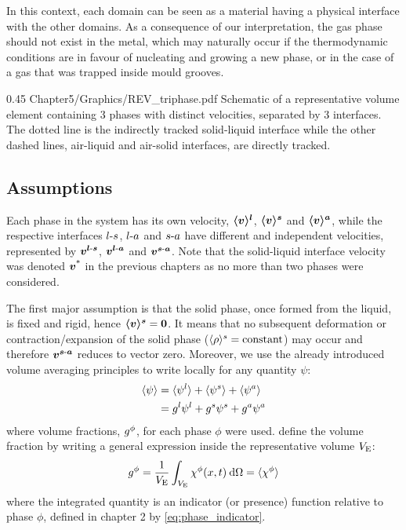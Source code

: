 In this context, each domain can be seen as a material having a physical
interface with the other domains. As a consequence of our interpretation, 
the gas phase should not exist in the metal, which may naturally
occur if the thermodynamic conditions are in favour of nucleating and growing 
a new phase, or in the case of a gas that was trapped inside mould grooves.
\begin{figureth}
{0.45}
{Chapter5/Graphics/REV_triphase.pdf}
{Schematic of a representative volume element containing 3 phases with distinct velocities, separated by 3 interfaces.
The dotted line is the indirectly tracked solid-liquid interface while the other dashed lines, air-liquid and air-solid
interfaces, are directly tracked.}
\label{fig:rev_triphase}
\end{figureth}

\subsection{Assumptions}
Each phase in the system has its own velocity, $\boldsymbol{\langle v \rangle^l}$, $\boldsymbol{\langle v \rangle^s}$ and $\boldsymbol{\langle v \rangle^a}$, while the respective
interfaces $l\text{-}s$, $l\text{-}a$ and $s\text{-}a$ have different and independent velocities, 
represented by $\boldsymbol{v^{l\text{-}s}}$, $\boldsymbol{v^{l\text{-}a}}$ and $\boldsymbol{v^{s\text{-}a}}$. Note that the solid-liquid interface
velocity was denoted $\boldsymbol{v^\text{*}}$ in the previous chapters as no more than two phases were considered.

The first major assumption is that the solid phase, once formed from the liquid, is fixed and rigid, hence $\boldsymbol{\langle v \rangle^s}=\boldsymbol{0}$.
It means that no subsequent deformation or contraction/expansion of the solid phase ($\langle \rho \rangle^s=\text{constant}$) may occur and therefore $\boldsymbol{v^{s\text{-}a}}$ reduces to vector zero.
Moreover, we use the already introduced volume averaging principles to write locally for any quantity $\psi$:
\begin{subequations}
\begin{align}
\label{eq:}
\langle \psi \rangle &= \langle \psi^l \rangle +  \langle \psi^s \rangle + \langle \psi^a \rangle \\
			&= {g^l} \psi^l + {g^s} \psi^s  + {g^a} \psi^a
\end{align}
\end{subequations}
where volume fractions, ${g^{\phi}} $, for each phase $\phi$ were used. \citet{rappaz_numerical_2003} define
the volume fraction by writing a general expression inside the representative volume $V_\text{E}$:
\begin{align}
\label{eq:}
{g^{\phi}}  = \frac{1}{V_\text{E}} \int_{V_\text{E}} \chi^\phi(x,t)\: \mathrm{d}\Omega = \langle \chi^\phi \rangle
\end{align}
where the integrated quantity is an indicator (or presence) function relative to phase $\phi$, defined
in chapter 2 by \cref{eq:phase_indicator}.

